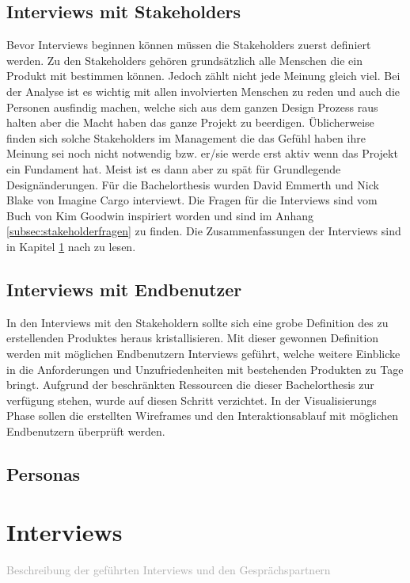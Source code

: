 \subsection{Interviews mit Stakeholders}
Bevor Interviews beginnen können müssen die Stakeholders zuerst definiert werden. Zu den Stakeholders gehören grundsätzlich alle Menschen die ein Produkt mit bestimmen können. Jedoch zählt nicht jede Meinung gleich viel. Bei der Analyse ist es wichtig mit allen involvierten Menschen zu reden und auch die Personen ausfindig machen, welche sich aus dem ganzen Design Prozess raus halten aber die Macht haben das ganze Projekt zu beerdigen. Üblicherweise finden sich solche Stakeholders im Management die das Gefühl haben ihre Meinung sei noch nicht notwendig bzw. er/sie werde erst aktiv wenn das Projekt ein Fundament hat. Meist ist es dann aber zu spät für Grundlegende Designänderungen. Für die Bachelorthesis wurden David Emmerth und Nick Blake von Imagine Cargo interviewt. Die Fragen für die Interviews sind vom Buch von Kim Goodwin inspiriert worden\citep[Kapitel 5]{goodwin2011designing} und sind im Anhang \ref{subsec:stakeholderfragen} zu finden. Die Zusammenfassungen der Interviews sind in Kapitel \ref{sec:interviews} nach zu lesen.

\subsection{Interviews mit Endbenutzer}
In den Interviews mit den Stakeholdern sollte sich eine grobe Definition des zu erstellenden Produktes heraus kristallisieren. Mit dieser gewonnen Definition werden mit möglichen Endbenutzern Interviews geführt, welche weitere Einblicke in die Anforderungen und Unzufriedenheiten mit bestehenden Produkten zu Tage bringt. Aufgrund der beschränkten Ressourcen die dieser Bachelorthesis zur verfügung stehen, wurde auf diesen Schritt verzichtet. In der Visualisierungs Phase sollen die erstellten Wireframes und den Interaktionsablauf mit möglichen Endbenutzern überprüft werden.

\subsection{Personas}






\section{Interviews}
\label{sec:interviews}
\textcolor{darkgray}{
	Beschreibung der geführten Interviews und den Gesprächspartnern
}